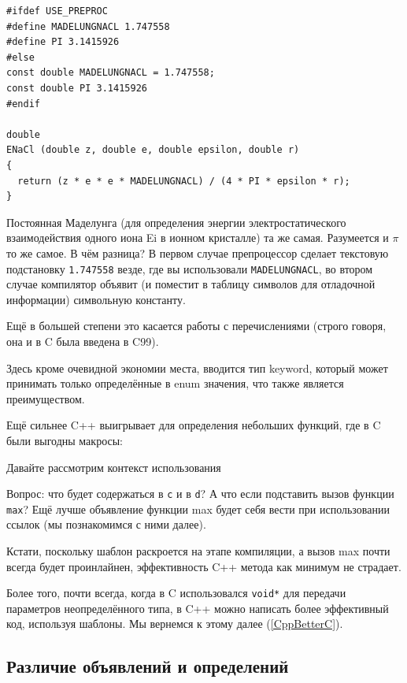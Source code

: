 \documentclass[a4paper,12pt,oneside]{article}
\begin{document}
\begin{lstlisting}
#ifdef USE_PREPROC
#define MADELUNGNACL 1.747558
#define PI 3.1415926
#else
const double MADELUNGNACL = 1.747558;
const double PI 3.1415926
#endif

double 
ENaCl (double z, double e, double epsilon, double r)
{
  return (z * e * e * MADELUNGNACL) / (4 * PI * epsilon * r);
}
\end{lstlisting}

Постоянная Маделунга (для определения энергии электростатического взаимодействия одного иона Ei в ионном кристалле) та же самая. Разумеется и $\pi$ то же самое. В чём разница? В первом случае препроцессор сделает текстовую подстановку \lstinline!1.747558! везде, где вы использовали \lstinline!MADELUNGNACL!, во втором случае компилятор объявит (и поместит в таблицу символов для отладочной информации) символьную константу. 

Ещё в большей степени это касается работы с перечислениями (строго говоря, она и в C была введена в C99).



Здесь кроме очевидной экономии места, вводится тип keyword, который может принимать только определённые в enum значения, что также является преимуществом.

Ещё сильнее C++ выигрывает для определения небольших функций, где в C были выгодны макросы:



Давайте рассмотрим контекст использования



Вопрос: что будет содержаться в \lstinline!c! и в \lstinline!d!? А что если подставить вызов функции \lstinline!max!? Ещё лучше объявление функции max будет себя вести при использовании ссылок (мы познакомимся с ними далее).

Кстати, поскольку шаблон раскроется на этапе компиляции, а вызов max почти всегда будет проинлайнен, эффективность C++ метода как минимум не страдает.

Более того, почти всегда, когда в C использовался \lstinline!void*! для передачи параметров неопределённого типа, в C++ можно написать более эффективный код, используя шаблоны. Мы вернемся к этому далее (\ref{CppBetterC}).

\subsection{Различие объявлений и определений}\label{DeclVsDef}
\end{document}
